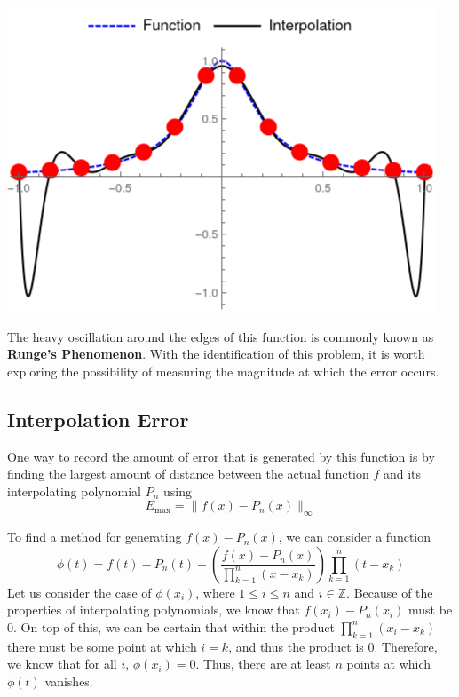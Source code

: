 \documentclass{article}
\begin{document}
{\begin{minipage}{0.3\textwidth}
        \captionsetup{justification=centering}
    \end{minipage}
    \begin{minipage}{0.3\textwidth}
        \includegraphics[width=\linewidth]{Images/RungeInterpolation_EvenlySpaced/runge_interpolation_14.png}
        \captionsetup{justification=centering}
        \label{fig:runge_evenlyspaced_14}
    \end{minipage}
}
\medbreak

The heavy oscillation around the edges of this function is commonly known as \textbf{Runge's Phenomenon}. With the identification of this problem, it is worth exploring the possibility of measuring the magnitude at which the error occurs.

\subsection{Interpolation Error}


One way to record the amount of error that is generated by this function is by finding the largest amount of distance between the actual function $f$ and its interpolating polynomial $P_n$ using
\begin{equation}
    E_{\max}=\lVert f(x)-P_n(x)\rVert_\infty
\end{equation}

To find a method for generating $f(x)-P_n(x)$, we can consider a function
\begin{equation}
    \phi(t) = f(t) - P_n(t) - \left(\frac{f(x)-P_n(x)}{\prod_{k=1}^n(x-x_k)}\right)\prod_{k=1}^n(t-x_k)
\end{equation}
Let us consider the case of $\phi(x_i)$, where $1\leq i\leq n$ and $i\in\mathbb{Z}$.\cite{youtube:interpolation_error} Because of the properties of interpolating polynomials, we know that $f(x_i)-P_n(x_i)$ must be 0. On top of this, we can be certain that within the product $\prod_{k=1}^n(x_i-x_k)$ there must be some point at which $i=k$, and thus the product is 0. Therefore, we know that for all $i$, $\phi(x_i)=0$. Thus, there are at least $n$ points at which $\phi(t)$ vanishes.
\end{document}
